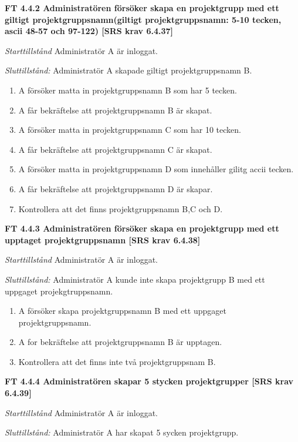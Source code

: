 \documentclass[a4paper]{article}
\begin{document}
\textbf{FT 4.4.2 Administratören försöker skapa en projektgrupp med ett giltigt projektgruppsnamn(giltigt projektgruppsnamn: 5-10 tecken, ascii 48-57 och 97-122) [SRS krav 6.4.37]}

\emph{Starttillstånd} Administratör A  är inloggat.

\emph{Sluttillstånd:} Administratör A  skapade  giltigt projektgruppsnamn B.

\begin{enumerate}
\item A försöker matta in projektgruppsnamn B som har 5 tecken.
\item A får bekräftelse att projektgruppsnamn B är skapat.
\item A försöker matta in projektgruppsnamn C som har 10 tecken.
\item A får bekräftelse att projektgruppsnamn C är skapat.
\item A försöker matta in projektgruppsnamn D som innehåller gilitg accii tecken.
\item A får bekräftelse att projektgruppsnamn D är skapar.
\item Kontrollera att det finns  projektgruppsnamn B,C och D.
\end{enumerate}

\textbf{FT 4.4.3 Administratören försöker skapa en projektgrupp med ett upptaget projektgruppsnamn [SRS krav 6.4.38]}

\emph{Starttillstånd} Administratör A är inloggat.

\emph{Sluttillstånd:} Administratör A kunde inte skapa  projektgrupp B med ett uppgaget projekgtruppsnamn.

\begin{enumerate}
\item A försöker skapa  projektgruppsnamn B med ett uppgaget projektgruppsnamn.
\item A for bekräftelse att projektgruppsnamn B är upptagen.
\item Kontrollera att det finns inte två projektgruppsnam B.
\end{enumerate}

\textbf{FT 4.4.4 Administratören skapar 5 stycken projektgrupper [SRS krav 6.4.39]}

\emph{Starttillstånd} Administratör A är inloggat. 

\emph{Sluttillstånd:} Administratör A har skapat 5 sycken projektgrupp.
\end{document}
